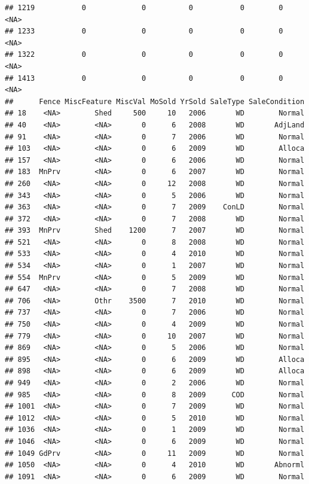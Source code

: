 \documentclass[]{article}
\begin{document}
\begin{verbatim}
## 1219           0             0          0           0        0   <NA>
## 1233           0             0          0           0        0   <NA>
## 1322           0             0          0           0        0   <NA>
## 1413           0             0          0           0        0   <NA>
##      Fence MiscFeature MiscVal MoSold YrSold SaleType SaleCondition
## 18    <NA>        Shed     500     10   2006       WD        Normal
## 40    <NA>        <NA>       0      6   2008       WD       AdjLand
## 91    <NA>        <NA>       0      7   2006       WD        Normal
## 103   <NA>        <NA>       0      6   2009       WD        Alloca
## 157   <NA>        <NA>       0      6   2006       WD        Normal
## 183  MnPrv        <NA>       0      6   2007       WD        Normal
## 260   <NA>        <NA>       0     12   2008       WD        Normal
## 343   <NA>        <NA>       0      5   2006       WD        Normal
## 363   <NA>        <NA>       0      7   2009    ConLD        Normal
## 372   <NA>        <NA>       0      7   2008       WD        Normal
## 393  MnPrv        Shed    1200      7   2007       WD        Normal
## 521   <NA>        <NA>       0      8   2008       WD        Normal
## 533   <NA>        <NA>       0      4   2010       WD        Normal
## 534   <NA>        <NA>       0      1   2007       WD        Normal
## 554  MnPrv        <NA>       0      5   2009       WD        Normal
## 647   <NA>        <NA>       0      7   2008       WD        Normal
## 706   <NA>        Othr    3500      7   2010       WD        Normal
## 737   <NA>        <NA>       0      7   2006       WD        Normal
## 750   <NA>        <NA>       0      4   2009       WD        Normal
## 779   <NA>        <NA>       0     10   2007       WD        Normal
## 869   <NA>        <NA>       0      5   2006       WD        Normal
## 895   <NA>        <NA>       0      6   2009       WD        Alloca
## 898   <NA>        <NA>       0      6   2009       WD        Alloca
## 949   <NA>        <NA>       0      2   2006       WD        Normal
## 985   <NA>        <NA>       0      8   2009      COD        Normal
## 1001  <NA>        <NA>       0      7   2009       WD        Normal
## 1012  <NA>        <NA>       0      5   2010       WD        Normal
## 1036  <NA>        <NA>       0      1   2009       WD        Normal
## 1046  <NA>        <NA>       0      6   2009       WD        Normal
## 1049 GdPrv        <NA>       0     11   2009       WD        Normal
## 1050  <NA>        <NA>       0      4   2010       WD       Abnorml
## 1091  <NA>        <NA>       0      6   2009       WD        Normal

\end{verbatim}
\end{document}
